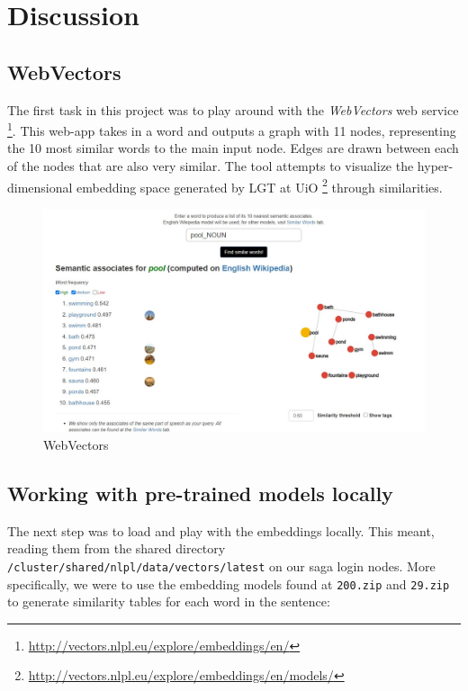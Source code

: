 \section{Discussion}
\label{chap:Discussion}

\subsection{WebVectors}
\label{chap:WebVectors}

\quad The first task in this project was to play around with the \textit{WebVectors} web service 
\footnote{
\href{http://vectors.nlpl.eu/explore/embeddings/en/} {http://vectors.nlpl.eu/explore/embeddings/en/}
}. 
This web-app takes in a word and outputs a graph with 11 nodes, representing the 10 most similar words to the main input node. Edges are drawn between each of the nodes that are also very similar. The tool attempts to visualize the hyper-dimensional embedding space generated by LGT at UiO 
\footnote{\href{http://vectors.nlpl.eu/explore/embeddings/en/models/\#MOD_enwiki_upos_skipgram_300_3_2019}{http://vectors.nlpl.eu/explore/embeddings/en/models/}}
through similarities. 

\begin{figure}[H]
\centering
\includegraphics[width=0.75\linewidth]{pictures/pool.jpg}
\caption{WebVectors}
\end{figure}

\subsection{Working with pre-trained models locally}
\label{Chap:Working with pre-trained models locally}
\quad The next step was to load and play with the embeddings locally. This meant, reading them from the shared directory \texttt{/cluster/shared/nlpl/data/vectors/latest} on our saga login nodes. More specifically, we were to use the embedding models found at \texttt{200.zip} and \texttt{29.zip} to generate similarity tables for each word in the sentence:

